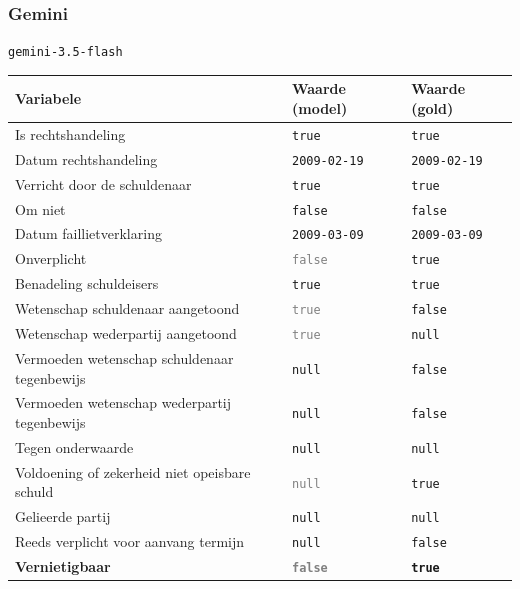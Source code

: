 \documentclass[
  dutch,
  a4paper,
]{article}
\begin{document}
\newpage


\subsubsection{Gemini}\label{gemini-27}

\texttt{gemini-3.5-flash}

\begin{center}
\small
\begin{tabular}{@{}p{7.4cm}p{2.6cm}p{2.6cm}@{}}
\toprule
Variabele & Waarde (model) & Waarde (gold) \\
\midrule
Is rechtshandeling & \texttt{true} & \texttt{true} \\
Datum rechtshandeling & \texttt{2009-02-19} & \texttt{2009-02-19} \\
Verricht door de schuldenaar & \texttt{true} & \texttt{true} \\
Om niet & \texttt{false} & \texttt{false} \\
Datum faillietverklaring & \texttt{2009-03-09} & \texttt{2009-03-09} \\
Onverplicht & \textcolor{gray}{\texttt{false}} & \texttt{true} \\
Benadeling schuldeisers & \texttt{true} & \texttt{true} \\
Wetenschap schuldenaar aangetoond & \textcolor{gray}{\texttt{true}} & \texttt{false} \\
Wetenschap wederpartij aangetoond & \textcolor{gray}{\texttt{true}} & \texttt{null} \\
Vermoeden wetenschap schuldenaar tegenbewijs & \texttt{null} & \texttt{false} \\
Vermoeden wetenschap wederpartij tegenbewijs & \texttt{null} & \texttt{false} \\
Tegen onderwaarde & \texttt{null} & \texttt{null} \\
Voldoening of zekerheid niet opeisbare schuld & \textcolor{gray}{\texttt{null}} & \texttt{true} \\
Gelieerde partij & \texttt{null} & \texttt{null} \\
Reeds verplicht voor aanvang termijn & \texttt{null} & \texttt{false} \\
\textbf{Vernietigbaar} & \textbf{\textcolor{gray}{\texttt{false}}} & \textbf{\texttt{true}} \\
\bottomrule
\end{tabular}
\end{center}
\end{document}
